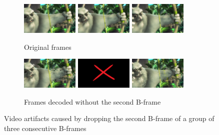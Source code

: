 \begin{figure}
    \centering
    \begin{subfigure}{\textwidth}
        \centering
        \includegraphics[width=0.3\textwidth]{figures/video_artifacts/all_frames/frame_00167.png}
        \includegraphics[width=0.3\textwidth]{figures/video_artifacts/all_frames/frame_00168.png}
        \includegraphics[width=0.3\textwidth]{figures/video_artifacts/all_frames/frame_00169.png}
        \caption{Original frames}
    \end{subfigure}

    \vspace{1em}

    \begin{subfigure}{\textwidth}
        \centering
        \includegraphics[width=0.3\textwidth]{figures/video_artifacts/drop_first_b_frame/frame_00149.png}
        \includegraphics[width=0.3\textwidth]{figures/video_artifacts/drop_first_b_frame/dropped.png}
        \includegraphics[width=0.3\textwidth]{figures/video_artifacts/drop_first_b_frame/frame_00150.png}
        \caption{Frames decoded without the second B-frame}
    \end{subfigure}
    \caption{Video artifacts caused by dropping the second B-frame of a group of three consecutive B-frames}
    \label{fig:video_artifacts}
\end{figure}

